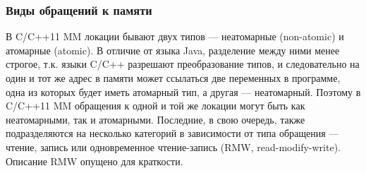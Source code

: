 \subsubsection{Виды обращений к памяти}
В C/C++11 MM локации бывают двух типов --- неатомарные (non-atomic) и атомарные (atomic).
В отличие от языка Java, разделение между ними менее строгое,
т.к. языки C/C++ разрешают преобразование типов, и следовательно
на один и тот же адрес в памяти может ссылаться две переменных в программе, одна из которых будет
иметь атомарный тип, а другая --- неатомарный.
Поэтому в C/C++11 MM обращения к одной и той же локации могут быть как неатомарными, так и атомарными.
Последние, в свою очередь, также подразделяются на несколько категорий в зависимости от типа обращения ---
чтение, запись или одновременное чтение-запись (RMW, read-modify-write)\label{acr:rmw}.
Описание RMW опущено для краткости.

